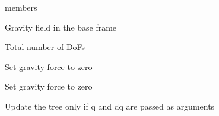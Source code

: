 \documentclass[letterpaper,10pt,english]{sphinxmanual}
\begin{document}
\begin{fulllineitems}
\begin{sphinxuseclass}{members}
\begin{description}
\begin{fulllineitems}
\end{fulllineitems}


\begin{fulllineitems}
\label{\detokenize{bodytree:BodyTree.g}}
\pysigstartsignatures
{}
\pysigstopsignatures
\sphinxAtStartPar
Gravity field in the base frame

\end{fulllineitems}


\begin{fulllineitems}
\label{\detokenize{bodytree:BodyTree.n}}
\pysigstartsignatures
{}
\pysigstopsignatures
\sphinxAtStartPar
Total number of DoFs

\end{fulllineitems}



\begin{fulllineitems}
\label{\detokenize{bodytree:BodyTree.ApparentForce}}
\pysigstartsignatures
{}
\pysigstopsignatures
\sphinxAtStartPar
Set gravity force to zero

\end{fulllineitems}


\begin{fulllineitems}
\label{\detokenize{bodytree:BodyTree.ApparentMatrix}}
\pysigstartsignatures
{}
\pysigstopsignatures
\sphinxAtStartPar
Set gravity force to zero

\end{fulllineitems}


\begin{fulllineitems}
\label{\detokenize{bodytree:BodyTree.D}}
\pysigstartsignatures
{}
\pysigstopsignatures
\sphinxAtStartPar
Update the tree only if q and dq are passed as arguments


\end{fulllineitems}
\end{description}
\end{sphinxuseclass}
\end{fulllineitems}
\end{document}
